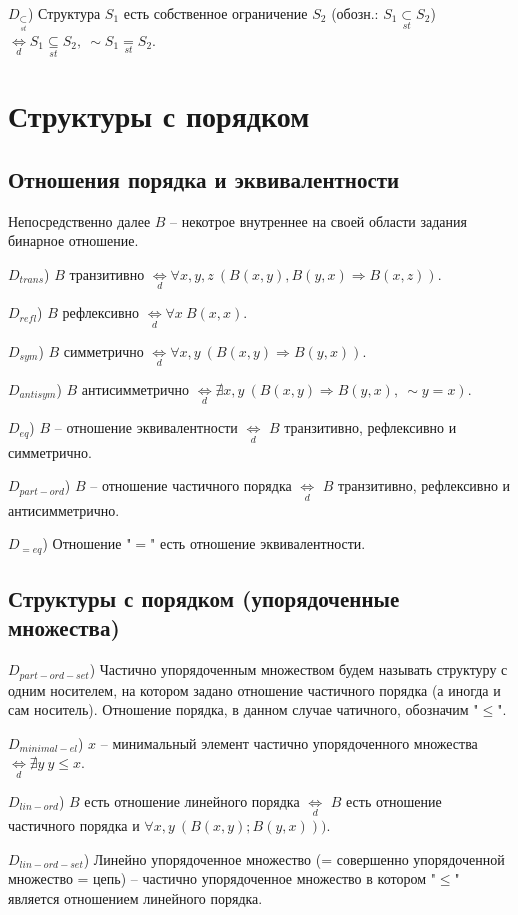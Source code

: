 \documentclass[a4paper]{article}
\newcommand{\Def}[0]{\underset{d}{\Leftrightarrow}}
\newcommand{\eqst}[0]{\underset{st}{=}} %
\newcommand{\subseteqst}[0]{\underset{st}{\subseteq}} %
\newcommand{\subsetst}[0]{\underset{st}{\subset}} %
\begin{document}
$D_{\subsetst}$) Структура $S_1$ есть собственное ограничение $S_2$ (обозн.: $S_1 \subsetst S_2$) $\Def S_1 \subseteqst S_2,~ \sim S_1 \eqst S_2$. 

\section{Структуры с порядком}

\subsection{Отношения порядка и эквивалентности}

Непосредственно далее $B$ -- некотрое внутреннее на своей области задания бинарное отношение.

$D_{trans}$) $B$ транзитивно $\Def \forall x, y, z~(B(x, y), B(y, x) \Rightarrow B(x, z))$.

$D_{refl}$) $B$ рефлексивно $\Def \forall x~B(x, x)$.

$D_{sym}$) $B$ симметрично $\Def \forall x, y~(B(x, y) \Rightarrow B(y, x))$.

$D_{antisym}$) $B$ антисимметрично $\Def \nexists x, y~(B(x, y) \Rightarrow B(y, x),~\sim y = x)$.

$D_{eq}$) $B$ -- отношение эквивалентности $\Def$ $B$ транзитивно, рефлексивно и симметрично.

$D_{part-ord}$) $B$ -- отношение частичного порядка $\Def$ $B$ транзитивно, рефлексивно и антисимметрично.

$D_{=eq}$) Отношение "$=$" есть отношение эквивалентности.

\subsection{Структуры с порядком (упорядоченные множества)}

$D_{part-ord-set}$) Частично упорядоченным множеством будем называть структуру с одним носителем, на котором задано отношение частичного порядка (а иногда и сам носитель). Отношение порядка, в данном случае чатичного, обозначим "$\leq$".

$D_{minimal-el}$) $x$ -- минимальный элемент частично упорядоченного множества $\Def \nexists y~y \leq x$.

$D_{lin-ord}$) $B$ есть отношение линейного порядка $\Def$ $B$ есть отношение частичного порядка и $\forall x, y~(B(x, y); B(y, x)))$.

$D_{lin-ord-set}$) Линейно упорядоченное множество (= совершенно упорядоченной множество = цепь) -- частично упорядоченное множество в котором "$\leq$" является отношением линейного порядка.
\end{document}
